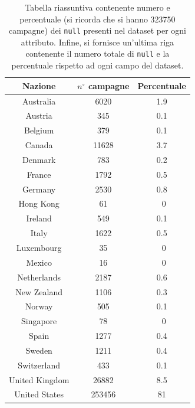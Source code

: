 \begin{table}
	\caption{Tabella riassuntiva contenente numero e percentuale (si ricorda che si hanno 323750 campagne) dei \texttt{null} presenti nel dataset per ogni attributo. Infine, si fornisce un'ultima riga contenente il numero totale di \texttt{null} e la percentuale rispetto ad ogni campo del dataset.}
	
	\label{tab:prj_country}
	
	\centering
	\begin{tabular}{|c|c|c|}
		\hline
		\textbf{Nazione} & \textbf{$n^{\circ}$ campagne} & \textbf{Percentuale}\\
		\hline
		Australia & 6020
& 1.9 \\
		\hline
		Austria & 345
& 0.1 \\
		\hline
		Belgium & 379
& 0.1\\
		\hline
		Canada & 11628
& 3.7\\
		\hline
		Denmark & 783
& 0.2\\
		\hline
		France & 1792
& 0.5\\
		\hline
		Germany & 2530
& 0.8\\
		\hline
		Hong Kong & 61
& ~0\\
		\hline
		Ireland & 549
& 0.1\\
		\hline
		Italy & 1622
& 0.5\\
		\hline
		Luxembourg & 35
& ~0\\
		\hline
		Mexico & 16
& ~0\\
		\hline
		Netherlands & 2187
& 0.6\\
		\hline
		New Zealand & 1106
& 0.3\\
		\hline
		Norway & 505
& 0.1\\
		\hline
		Singapore & 78
& ~0\\
		\hline
		Spain & 1277
& 0.4\\
		\hline
		Sweden & 1211
& 0.4\\
		\hline
		Switzerland & 433
& 0.1\\
		\hline
		United Kingdom & 26882
& 8.5\\
		\hline
		United States & 253456 & 81\\
		\hline
	\end{tabular}
\end{table}
